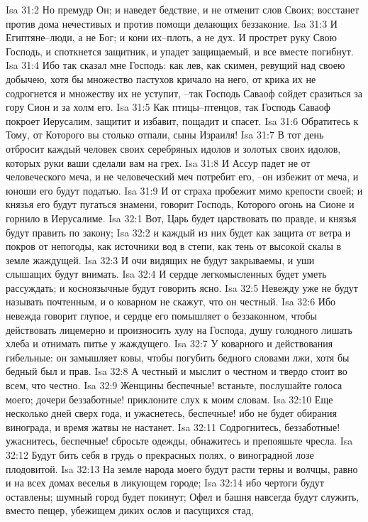 Isa 31:2  Но премудр Он; и наведет бедствие, и не отменит слов Своих; восстанет против дома нечестивых и против помощи делающих беззаконие.
Isa 31:3  И Египтяне--люди, а не Бог; и кони их--плоть, а не дух. И прострет руку Свою Господь, и споткнется защитник, и упадет защищаемый, и все вместе погибнут.
Isa 31:4  Ибо так сказал мне Господь: как лев, как скимен, ревущий над своею добычею, хотя бы множество пастухов кричало на него, от крика их не содрогнется и множеству их не уступит, --так Господь Саваоф сойдет сразиться за гору Сион и за холм его.
Isa 31:5  Как птицы--птенцов, так Господь Саваоф покроет Иерусалим, защитит и избавит, пощадит и спасет.
Isa 31:6  Обратитесь к Тому, от Которого вы столько отпали, сыны Израиля!
Isa 31:7  В тот день отбросит каждый человек своих серебряных идолов и золотых своих идолов, которых руки ваши сделали вам на грех.
Isa 31:8  И Ассур падет не от человеческого меча, и не человеческий меч потребит его, --он избежит от меча, и юноши его будут податью.
Isa 31:9  И от страха пробежит мимо крепости своей; и князья его будут пугаться знамени, говорит Господь, Которого огонь на Сионе и горнило в Иерусалиме.
Isa 32:1  Вот, Царь будет царствовать по правде, и князья будут править по закону;
Isa 32:2  и каждый из них будет как защита от ветра и покров от непогоды, как источники вод в степи, как тень от высокой скалы в земле жаждущей.
Isa 32:3  И очи видящих не будут закрываемы, и уши слышащих будут внимать.
Isa 32:4  И сердце легкомысленных будет уметь рассуждать; и косноязычные будут говорить ясно.
Isa 32:5  Невежду уже не будут называть почтенным, и о коварном не скажут, что он честный.
Isa 32:6  Ибо невежда говорит глупое, и сердце его помышляет о беззаконном, чтобы действовать лицемерно и произносить хулу на Господа, душу голодного лишать хлеба и отнимать питье у жаждущего.
Isa 32:7  У коварного и действования гибельные: он замышляет ковы, чтобы погубить бедного словами лжи, хотя бы бедный был и прав.
Isa 32:8  А честный и мыслит о честном и твердо стоит во всем, что честно.
Isa 32:9  Женщины беспечные! встаньте, послушайте голоса моего; дочери беззаботные! приклоните слух к моим словам.
Isa 32:10  Еще несколько дней сверх года, и ужаснетесь, беспечные! ибо не будет обирания винограда, и время жатвы не настанет.
Isa 32:11  Содрогнитесь, беззаботные! ужаснитесь, беспечные! сбросьте одежды, обнажитесь и препояшьте чресла.
Isa 32:12  Будут бить себя в грудь о прекрасных полях, о виноградной лозе плодовитой.
Isa 32:13  На земле народа моего будут расти терны и волчцы, равно и на всех домах веселья в ликующем городе;
Isa 32:14  ибо чертоги будут оставлены; шумный город будет покинут; Офел и башня навсегда будут служить, вместо пещер, убежищем диких ослов и пасущихся стад,
